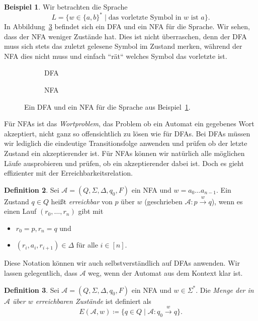 \documentclass[11pt, a4paper]{article}
\theoremstyle{definition}
\newtheorem{definition}{Definition}[section]
\newtheorem{example}[definition]{Beispiel}
\theoremstyle{plain}
\numberwithin{equation}{section}
\newcommand{\reaches}[1]{\overset{#1}{\rightarrow}}
\begin{document}
\begin{example}\label{exp:ex2}
	Wir betrachten die Sprache
	\[
		L = \{ w \in \{a, b\}^\ast \mid \text{das vorletzte Symbol in } w \text{ ist } a \}.
	\]
	In Abbildung~\ref{fig:nfa_ex1} befindet sich ein DFA und ein NFA für die Sprache. Wir sehen, dass der NFA weniger Zustände hat. Dies ist nicht überraschen, denn der DFA muss sich stets das zuletzt gelesene Symbol im Zustand merken, während der NFA dies nicht muss und einfach ``rät`` welches Symbol das vorletzte ist.
\end{example}
\begin{figure}
	\centering
	\begin{subfigure}[b]{.49\textwidth}
		\centering
		
		\caption{DFA}
		\label{fig:nfa_ex1dfa}
	\end{subfigure}
	\begin{subfigure}[b]{.49\textwidth}
		\centering
		
		\caption{NFA}
		\label{fig:nfa_ex1nfa}
	\end{subfigure}
	\caption{Ein DFA und ein NFA für die Sprache aus Beispiel~\ref{exp:ex2}.}
	\label{fig:nfa_ex1}
\end{figure}
Für NFAs ist das \textit{Wortproblem}, das Problem ob ein Automat ein gegebenes Wort akzeptiert, nicht ganz so offensichtlich zu lösen wie für DFAs. Bei DFAs müssen wir lediglich die eindeutige Transitionsfolge anwenden und prüfen ob der letzte Zustand ein akzeptierender ist. Für NFAs können wir natürlich alle möglichen Läufe ausprobieren und prüfen, ob ein akzeptierender dabei ist. Doch es gieht effizienter mit der Erreichbarkeitsrelation.
\begin{definition}\label{def:reachability}
	Sei \( \mathcal{A} = (Q, \Sigma, \Delta, q_0, F) \) ein NFA und \( w = a_0 \ldots a_{n-1} \). Ein Zustand \( q \in Q \) heißt \textit{erreichbar} von \( p \) über \( w \) (geschrieben \( \mathcal{A}: p \reaches{w} q \)), wenn es einen Lauf \( (r_0, \ldots, r_n) \) gibt mit 
	\begin{itemize}
		\item \( r_0 = p, r_n = q \) und
		\item \( (r_i, a_i, r_{i+1}) \in \Delta \) für alle \( i \in [n] \).
	\end{itemize}
\end{definition}
Diese Notation können wir auch selbstverständlich auf DFAs anwenden. Wir lassen gelegentlich, dass \( \mathcal{A} \) weg, wenn der Automat aus dem Kontext klar ist.
\begin{definition}
	Sei \( \mathcal{A} = (Q, \Sigma, \Delta, q_0, F) \) ein NFA und \( w \in \Sigma^\ast \). Die \textit{Menge der in \( \mathcal{A} \) über \( w \) erreichbaren Zustände} ist definiert als
	\[
		E(\mathcal{A}, w) \coloneqq \{ q \in Q \mid \mathcal{A}: q_0 \reaches{w} q \}.
	\]
\end{definition}
\end{document}
